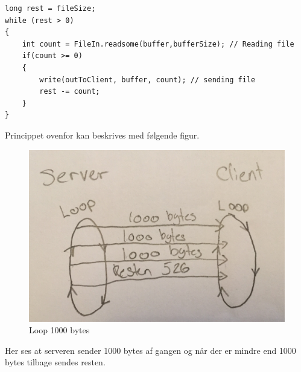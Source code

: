 \begin{lstlisting}
long rest = fileSize;
while (rest > 0)
{
	int count = FileIn.readsome(buffer,bufferSize); // Reading file 
	if(count >= 0)
	{
		write(outToClient, buffer, count); // sending file
		rest -= count;
	}
}
\end{lstlisting}

\clearpage
Princippet ovenfor kan beskrives med følgende figur. 
\begin{figure}[h]
\centering
\includegraphics[width=0.7\linewidth]{Pic/Loop}
\caption{Loop 1000 bytes}
\label{fig:Loop}
\end{figure}

Her ses at serveren sender 1000 bytes af gangen og når der er mindre end 1000 bytes tilbage sendes resten. 


